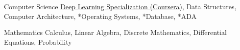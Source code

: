 

\begin{cvskills}

  \cvskill
    {Computer Science} %
    {{\href{https://www.coursera.org/specializations/deep-learning}{Deep Learning Specialization (Coursera)}}, Data Structures, Computer Architecture, *Operating Systems, *Database, *ADA} %


  \cvskill
    {Mathematics} %
    {Calculus, Linear Algebra, Discrete Mathematics, Differential Equations, Probability} %




\end{cvskills}
